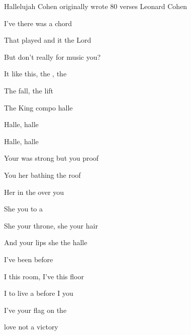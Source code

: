 \begin{SBSong}{Hallelujah}
  {Cohen originally wrote 80 verses}
  {Leonard Cohen}
  \begin{SBVerse}
    I've  there was a  chord

    That  played and it  the Lord

    But  don't really  for music  you? 

    It  like this, the , the 
    
    The  fall, the  lift

    The  King compo halle
  \end{SBVerse}
  \begin{SBChorus}
    Halle, halle

    Halle, halle  
  \end{SBChorus}
  \begin{SBVerse}
    Your  was strong but you  proof
    
    You  her bathing  the roof
    
    Her  in the  over you 

    She  you to a  
    
    She  your throne, she  your hair
    
    And  your lips she  the halle
  \end{SBVerse}
  \begin{SBVerse}
     I've been  before
    
    I  this room, I've  this floor
    
    I  to live a before I  you 

    I've  your flag on the  
    
    love  not a victory 
    

\end{SBVerse}
\end{SBSong}
